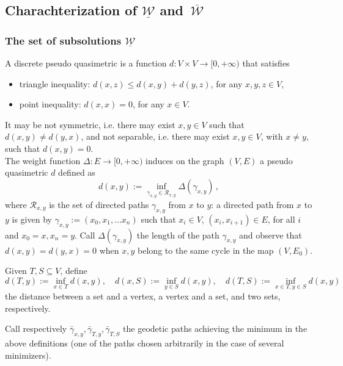 \documentclass[reqno]{amsart}
\theoremstyle{plain}
\theoremstyle{definition}
\theoremstyle{remark}
\numberwithin{equation}{section}
\numberwithin{theorem}{section}
\newcommand{\upbar}[1]{\,\overline{\! #1}}
\newcommand{\<}{\langle}
\renewcommand{\>}{\rangle}
\begin{document}
\medskip

\subsection{Charachterization of $\underline {\mathcal W}$ and  $\upbar{\mathcal W}$}

\subsubsection{The set of subsolutions  $\underline {\mathcal W}$}  A discrete pseudo quasimetric is a function $d:V\times V\to \mathbb [0,+\infty)$ that satisfies
\begin{itemize}
	\item triangle inequality: $d(x,z)\leq d(x,y)+d(y,z)$, for any $x,y,z\in V$,
	\item point inequality: $d(x,x)=0$, for any $x\in V$. 
\end{itemize}
It may be not symmetric, i.e. there may exist $x,y\in V$ such that $d(x,y)\neq d(y,x)$, and not separable, i.e. there may exist $x,y\in V$, with $x\neq y$, such that $d(x,y)=0$.\\

The weight function $\Delta: E\to \mathbb [0,+\infty)$ induces on the graph $(V,E)$ a pseudo quasimetric $d$ defined as
\begin{equation}\label{defd}
	d(x,y):=\inf_{\gamma_{x,y}\in \mathcal{R}_{x,y}}\Delta(\gamma_{x,y})\,,
\end{equation}
where $\mathcal{R}_{x,y}$ is the set of directed paths $\gamma_{x,y}$ from $x$ to $y$: a directed path from $x$ to $y$ is given by $\gamma_{x,y}:= (x_0, x_1, \dots x_n)$ such that $x_i\in V$,  $(x_i,x_{i+1})\in E$, for all $i$ and  $x_0=x, x_n=y$. Call  $\Delta(\gamma_ {x,y})$ the length of the path $\gamma_ {x,y}$ and observe that $d(x,y)=d(y,x)=0$ when $x,y$ belong to the same cycle in the map $(V,E_0)$.

Given $T,S\subseteq V$,  define 
\[d(T,y):=\inf_{x\in T}d(x,y), \quad d(x,S):=\inf_{y\in S}d(x,y),\quad d(T,S):=\inf_{x\in T,y\in S}d(x,y) \]
the distance between a set and a vertex, a vertex and a set, and two sets, respectively.


Call respectively $\bar \gamma_{x,y}, \bar \gamma_{T,y}, \bar \gamma_{T,S}$ the geodetic paths  achieving the minimum in the above definitions (one of the paths chosen arbitrarily in the case of several minimizers).
\end{document}
